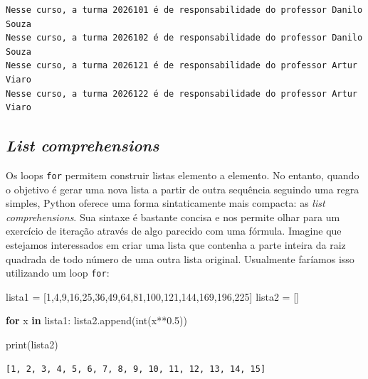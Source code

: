 \documentclass[
  brazilian,
  letterpaper,
  DIV=11,
  numbers=noendperiod]{scrreprt}
\newenvironment{Shaded}{\begin{snugshade}}{\end{snugshade}}
\newcommand{\BuiltInTok}[1]{\textcolor[rgb]{0.00,0.23,0.31}{#1}}
\newcommand{\ControlFlowTok}[1]{\textcolor[rgb]{0.00,0.23,0.31}{\textbf{#1}}}
\newcommand{\DecValTok}[1]{\textcolor[rgb]{0.68,0.00,0.00}{#1}}
\newcommand{\FloatTok}[1]{\textcolor[rgb]{0.68,0.00,0.00}{#1}}
\newcommand{\KeywordTok}[1]{\textcolor[rgb]{0.00,0.23,0.31}{\textbf{#1}}}
\newcommand{\NormalTok}[1]{\textcolor[rgb]{0.00,0.23,0.31}{#1}}
\newcommand{\OperatorTok}[1]{\textcolor[rgb]{0.37,0.37,0.37}{#1}}
\begin{document}
\begin{verbatim}
Nesse curso, a turma 2026101 é de responsabilidade do professor Danilo Souza
Nesse curso, a turma 2026102 é de responsabilidade do professor Danilo Souza
Nesse curso, a turma 2026121 é de responsabilidade do professor Artur Viaro
Nesse curso, a turma 2026122 é de responsabilidade do professor Artur Viaro
\end{verbatim}

\subsection{\texorpdfstring{\emph{List
comprehensions}}{List comprehensions}}\label{list-comprehensions}

Os loops \texttt{for} permitem construir listas elemento a elemento. No
entanto, quando o objetivo é gerar uma nova lista a partir de outra
sequência seguindo uma regra simples, Python oferece uma forma
sintaticamente mais compacta: as \emph{list comprehensions}. Sua sintaxe
é bastante concisa e nos permite olhar para um exercício de iteração
através de algo parecido com uma fórmula. Imagine que estejamos
interessados em criar uma lista que contenha a parte inteira da raiz
quadrada de todo número de uma outra lista original. Usualmente faríamos
isso utilizando um loop \texttt{for}:

\begin{Shaded}
\begin{Highlighting}[]
\NormalTok{lista1 }\OperatorTok{=}\NormalTok{ [}\DecValTok{1}\NormalTok{,}\DecValTok{4}\NormalTok{,}\DecValTok{9}\NormalTok{,}\DecValTok{16}\NormalTok{,}\DecValTok{25}\NormalTok{,}\DecValTok{36}\NormalTok{,}\DecValTok{49}\NormalTok{,}\DecValTok{64}\NormalTok{,}\DecValTok{81}\NormalTok{,}\DecValTok{100}\NormalTok{,}\DecValTok{121}\NormalTok{,}\DecValTok{144}\NormalTok{,}\DecValTok{169}\NormalTok{,}\DecValTok{196}\NormalTok{,}\DecValTok{225}\NormalTok{]}
\NormalTok{lista2 }\OperatorTok{=}\NormalTok{ []}

\ControlFlowTok{for}\NormalTok{ x }\KeywordTok{in}\NormalTok{ lista1:}
\NormalTok{    lista2.append(}\BuiltInTok{int}\NormalTok{(x}\OperatorTok{**}\FloatTok{0.5}\NormalTok{))}
    
\BuiltInTok{print}\NormalTok{(lista2)}
\end{Highlighting}
\end{Shaded}

\begin{verbatim}
[1, 2, 3, 4, 5, 6, 7, 8, 9, 10, 11, 12, 13, 14, 15]
\end{verbatim}
\end{document}
